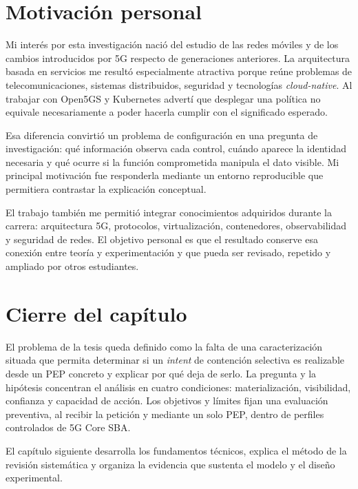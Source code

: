 \section{Motivación personal}
\label{sec:motivacion-cap1}

Mi interés por esta investigación nació del estudio de las redes móviles y de los cambios introducidos por 5G respecto de generaciones anteriores. La arquitectura basada en servicios me resultó especialmente atractiva porque reúne problemas de telecomunicaciones, sistemas distribuidos, seguridad y tecnologías \textit{cloud-native}. Al trabajar con Open5GS y Kubernetes advertí que desplegar una política no equivale necesariamente a poder hacerla cumplir con el significado esperado.

Esa diferencia convirtió un problema de configuración en una pregunta de investigación: qué información observa cada control, cuándo aparece la identidad necesaria y qué ocurre si la función comprometida manipula el dato visible. Mi principal motivación fue responderla mediante un entorno reproducible que permitiera contrastar la explicación conceptual.

\newpage

El trabajo también me permitió integrar conocimientos adquiridos durante la carrera: arquitectura 5G, protocolos, virtualización, contenedores, observabilidad y seguridad de redes. El objetivo personal es que el resultado conserve esa conexión entre teoría y experimentación y que pueda ser revisado, repetido y ampliado por otros estudiantes.

\section{Cierre del capítulo}
\label{sec:cierre-cap1}

El problema de la tesis queda definido como la falta de una caracterización situada que permita determinar si un \textit{intent} de contención selectiva es realizable desde un PEP concreto y explicar por qué deja de serlo. La pregunta y la hipótesis concentran el análisis en cuatro condiciones: materialización, visibilidad, confianza y capacidad de acción. Los objetivos y límites fijan una evaluación preventiva, al recibir la petición y mediante un solo PEP, dentro de perfiles controlados de 5G Core SBA.

El capítulo siguiente desarrolla los fundamentos técnicos, explica el método de la revisión sistemática y organiza la evidencia que sustenta el modelo y el diseño experimental.
